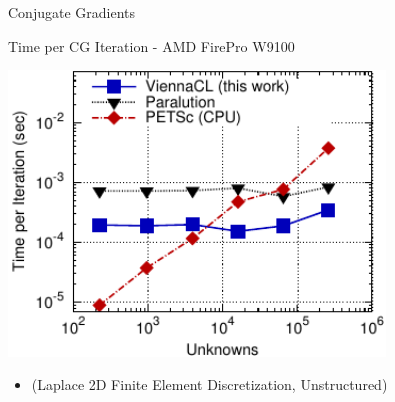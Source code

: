 \begin{frame}[fragile]{Conjugate Gradients}
 \begin{block}{Time per CG Iteration - AMD FirePro W9100}
 \begin{center}
  \vspace*{-0.01cm}
  \includegraphics[width=0.75\textwidth]{figures/time-laplace2d-W9100-cg}
 \end{center}

 \begin{itemize}
  \item   \vspace*{-0.3cm} {\small (Laplace 2D Finite Element Discretization, Unstructured)}
 \end{itemize}
 \end{block}   
\end{frame}


